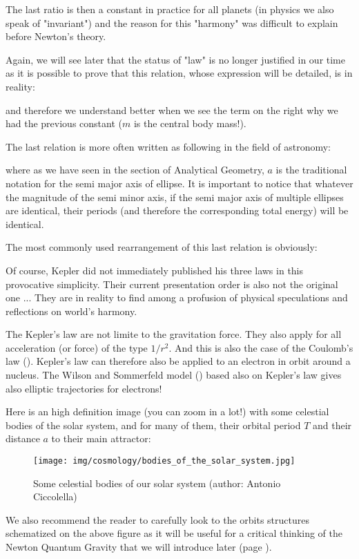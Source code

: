 	The last ratio is then a constant in practice for all planets (in physics we also speak of "invariant") and the reason for this "harmony" was difficult to explain before Newton's theory.
	
	Again, we will see later that the status of "law" is no longer justified in our time as it is possible to prove that this relation, whose expression will be detailed, is in reality:
	
	and therefore we understand better when we see the term on the right why we had the previous constant ($m$ is the central body mass!).
	
	The last relation is more often written as following in the field of astronomy:
	
	where as we have seen in the section of Analytical Geometry, $a$ is the traditional notation for the semi major axis of ellipse. It is important to notice that whatever the magnitude of the semi minor axis,  if the semi major axis of multiple ellipses are identical, their periods (and therefore the corresponding total energy) will be identical.
	
	The most commonly used rearrangement of this last relation is obviously:
	
		
	Of course, Kepler did not immediately published his three laws in this provocative simplicity. Their current presentation order is also not the original one ... They are  in reality to find among  a profusion of physical speculations and reflections on world's harmony.
	
	\begin{tcolorbox}[title=Remark,colframe=black,arc=10pt]
	The Kepler's law are not limite to the gravitation force. They also apply for all acceleration (or force) of the type $1/r^2$. And this is also the case of the Coulomb's law (). Kepler's law can therefore also be applied to an electron in orbit around a nucleus. The Wilson and Sommerfeld model () based also on Kepler's law gives also elliptic trajectories for electrons!
	\end{tcolorbox}	
	Here is an high definition image (you can zoom in a lot!) with some celestial bodies of the solar system, and for many of them, their orbital period $T$ and their distance $a$ to their main attractor:
	\begin{figure}[H]
		\centering
		\texttt{[image: img/cosmology/bodies\_of\_the\_solar\_system.jpg]}
		\caption[Some celestial bodies of our solar system]{Some celestial bodies of our solar system (author: Antonio Ciccolella)}
	\end{figure}
	We also recommend the reader to carefully look to the orbits structures schematized on the above figure as it will be useful for a critical thinking of the Newton Quantum Gravity that we will introduce later (page \pageref{newton quantum gravity}).
	
